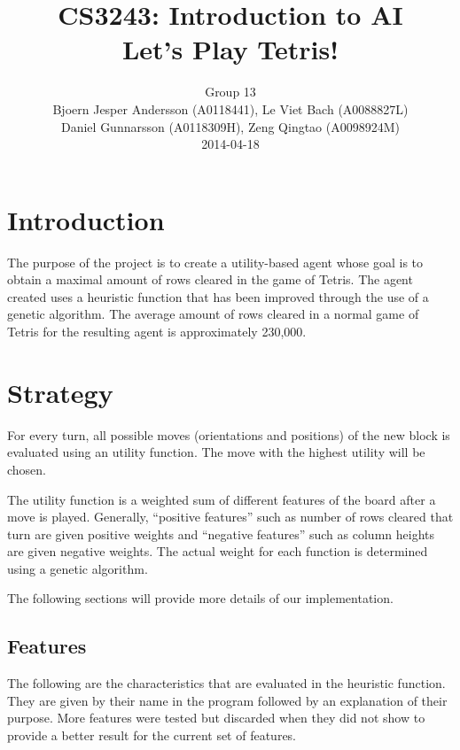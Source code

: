 \documentclass[twocolumn,12pt,journal,final]{IEEEtran_modified}
\begin{document}
\title{CS3243: Introduction to AI\\ Let’s Play Tetris! }

\author{
  Group 13 \\
  Bjoern Jesper Andersson (A0118441), Le Viet Bach (A0088827L) \\ Daniel Gunnarsson (A0118309H), Zeng Qingtao (A0098924M) \\
  2014-04-18 \\ 
}

\maketitle

\section{Introduction} 
The purpose of the project is to create a utility-based agent whose goal is to obtain a maximal amount of rows cleared in the game of Tetris. The agent created uses a heuristic function that has been improved through the use of a genetic algorithm. The average amount of rows cleared in a normal game of Tetris for the resulting agent is approximately 230,000.

\section{Strategy} 
For every turn, all possible moves (orientations and positions) of the new block is evaluated using an utility function. The move with the highest utility will be chosen.

The utility function is a weighted sum of different features of the board after a move is played. Generally, “positive features” such as number of rows cleared that turn are given positive weights and “negative features” such as column heights are given negative weights. The actual weight for each function is determined using a genetic algorithm.

The following sections will provide more details of our implementation.

\subsection{Features}
The following are the characteristics that are evaluated in the heuristic function. They are given by their name in the program followed by an explanation of their purpose. More features were tested but discarded when they did not show to provide a better result for the current set of features.
\end{document}
